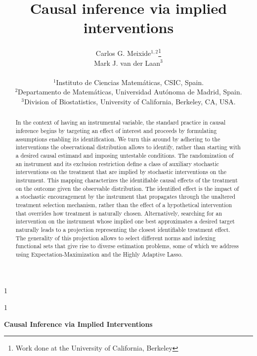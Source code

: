 \documentclass[12pt]{article}
\theoremstyle{thmstyleone}%
\theoremstyle{thmstyletwo}%
\theoremstyle{thmstylethree}%
\newcommand{\anon}{1}
\begin{document}
\def\spacingset#1{\renewcommand{\baselinestretch}%
{#1}\small\normalsize} \spacingset{1}




\anon
{
  \title{\bf Causal inference via implied interventions}
  \author{Carlos G. Meixide$^{1,2}$\thanks{Work done at the University of California, Berkeley} \\ 
    Mark J. van der Laan$^{3}$ \\
    \phantom{s} \\
	$^{1}$Instituto de Ciencias Matemáticas, CSIC, Spain. \\
	$^{2}$Departamento de Matemáticas, Universidad Autónoma de Madrid, Spain. \\
	$^{3}$Division of Biostatistics, University of California, Berkeley, CA, USA.}
  \maketitle
} \fi

\anon
{
  \bigskip
  \bigskip
  \bigskip
  \begin{center}
    {\LARGE\bf Causal Inference via Implied Interventions}
\end{center}
  \medskip
} \fi

\bigskip
\begin{abstract}
	In the context of having an instrumental variable, the standard practice in causal inference begins by targeting an effect of interest and proceeds by formulating assumptions enabling its identification. We turn this around by adhering to the interventions the observational distribution allows to identify, rather than starting with a desired causal estimand and imposing untestable conditions. The randomization of an instrument and its exclusion restriction define a class of auxiliary stochastic interventions on the treatment that are implied by stochastic interventions on the instrument. This mapping characterizes the identifiable causal effects of the treatment on the outcome given the observable distribution.  The identified effect is the impact of a stochastic encouragement by the instrument that propagates through the unaltered treatment selection mechanism, rather than the effect of a hypothetical intervention that overrides how treatment is naturally chosen. Alternatively, searching for an intervention on the instrument whose implied one best approximates a desired target naturally leads to a projection representing the closest identifiable treatment effect. The generality of this projection allows to select different norms and indexing functional sets that give rise to diverse estimation problems, some of which we address using Expectation-Maximization and the Highly Adaptive Lasso.
\end{abstract}
\end{document}
